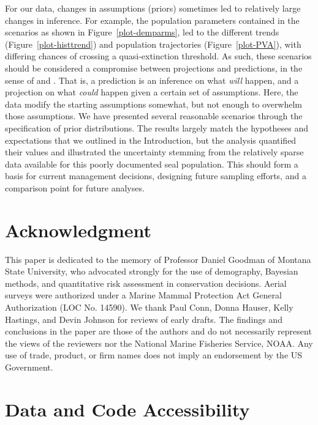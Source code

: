 \documentclass[]{risa}\usepackage[]{graphicx}\usepackage[]{color}
\begin{document}
For our data, changes in assumptions (priors) sometimes led to relatively large changes in inference.  For example, the population parameters contained in the scenarios as shown in Figure~\ref{plot-demparms}, led to the different trends (Figure~\ref{plot-histtrend}) and population trajectories (Figure~\ref{plot-PVA}), with differing chances of crossing a quasi-extinction threshold.  As such, these scenarios should be considered a compromise between projections and predictions, in the sense of \citet{Keyf:futu:1972} and \citet[pg. 29]{Casw:matr:2001}.  That is, a prediction is an inference on what \emph{will} happen, and a projection on what \emph{could} happen given a certain set of assumptions.  Here, the data modify the starting assumptions somewhat, but not enough to overwhelm those assumptions.  We have presented several reasonable scenarios through the specification of prior distributions. The results largely match the hypotheses and expectations that we outlined in the Introduction, but the analysis quantified their values and illustrated the uncertainty stemming from the relatively sparse data available for this poorly documented seal population.  This should form a basis for current management decisions, designing future sampling efforts, and a comparison point for future analyses. 

\backmatter

\section*{Acknowledgment}

This paper is dedicated to the memory of Professor Daniel Goodman of Montana State University, who advocated strongly for the use of demography, Bayesian methods, and quantitative risk assessment in conservation decisions. Aerial surveys were authorized under a Marine Mammal Protection Act General Authorization (LOC No. 14590). We thank Paul Conn, Donna Hauser, Kelly Hastings, and Devin Johnson for reviews of early drafts. The findings and conclusions in the paper are those of the authors and do not necessarily represent the views of the reviewers nor the National Marine Fisheries Service, NOAA. Any use of trade, product, or firm names does not imply an endorsement by the US Government.

\section*{Data and Code Accessibility} 
\end{document}
